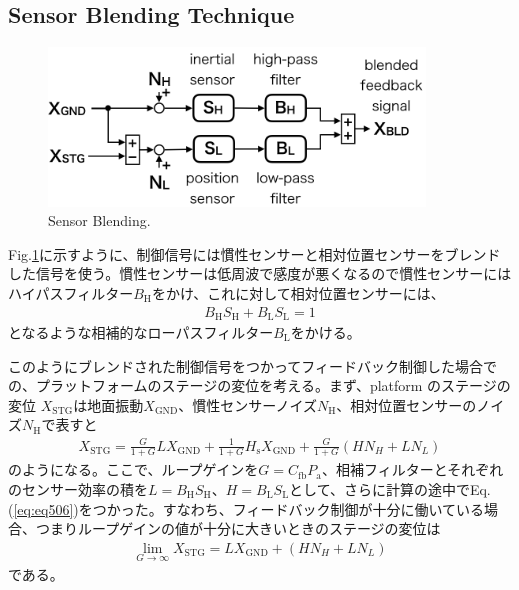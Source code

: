\subsection{Sensor Blending Technique}
\begin{figure}[h]
  \begin{center}   
    \includegraphics[width=10cm]{./img_chap5/img507.png}
    \caption{Sensor Blending.} \label{img:img507}
  \end{center}
\end{figure}

Fig.\ref{img:img507}に示すように、制御信号には慣性センサーと相対位置センサーをブレンドした信号を使う。慣性センサーは低周波で感度が悪くなるので慣性センサーにはハイパスフィルター$B_{\mathrm{H}}$をかけ、これに対して相対位置センサーには、
\begin{eqnarray}
  B_{\mathrm{H}}S_{\mathrm{H}} + B_{\mathrm{L}}S_{\mathrm{L}} = 1   \label{eq:eq506}
\end{eqnarray}
となるような相補的なローパスフィルター$B_{\mathrm{L}}$をかける。

このようにブレンドされた制御信号をつかってフィードバック制御した場合での、プラットフォームのステージの変位を考える。まず、platform のステージの変位 $X_{\mathrm{STG}}$は地面振動$X_{\mathrm{GND}}$、慣性センサーノイズ$N_{\mathrm{H}}$、相対位置センサーのノイズ$N_{\mathrm{H}}$で表すと
\begin{eqnarray}
  X_{\mathrm{STG}} = \frac{G}{1+G}LX_{\mathrm{GND}} + \frac{1}{1+G}H_{\mathrm{s}}X_{\mathrm{GND}} + \frac{G}{1+G}\left(HN_{H}+LN_{L}\right)   \label{eq:eq510}
\end{eqnarray}
のようになる。ここで、ループゲインを$G=C_{\mathrm{fb}}P_{\mathrm{a}}$、相補フィルターとそれぞれのセンサー効率の積を$L=B_{\mathrm{H}}S_{\mathrm{H}}$、$H=B_{\mathrm{L}}S_{\mathrm{L}}$として、さらに計算の途中でEq.(\ref{eq:eq506})をつかった。すなわち、フィードバック制御が十分に働いている場合、つまりループゲインの値が十分に大きいときのステージの変位は
\begin{eqnarray}
  \lim_{G\to\infty} X_{\mathrm{STG}} = LX_{\mathrm{GND}} + \left(HN_{H}+LN_{L}\right) \label{eq:eq510_a}
\end{eqnarray}
である。

